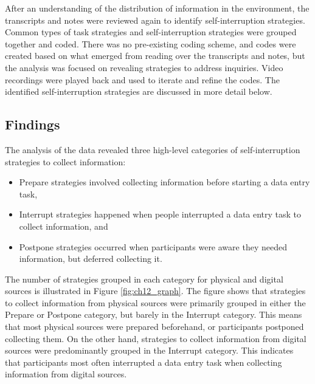 
After an understanding of the distribution of information in the environment, the transcripts and notes were reviewed again to identify self-interruption strategies. Common types of task strategies and self-interruption strategies were grouped together and coded. There was no pre-existing coding scheme, and codes were created based on what emerged from reading over the transcripts and notes, but the analysis was focused on revealing strategies to address inquiries. Video recordings were played back and used to iterate and refine the codes. The identified self-interruption strategies are discussed in more detail below. 

\subsection{Findings}
The analysis of the data revealed three high-level categories of self-interruption strategies to collect information: 

\begin{itemize}
\item
Prepare strategies involved collecting information before starting a data entry task, 
\item
Interrupt strategies happened when people interrupted a data entry task to collect information, and 
\item
Postpone strategies occurred when participants were aware they needed information, but deferred collecting it. 
\end{itemize}

The number of strategies grouped in each category for physical and digital sources is illustrated in Figure \ref{fig:ch12_graph}. The figure shows that strategies to collect information from physical sources were primarily grouped in either the Prepare or Postpone category, but barely in the Interrupt category. This means that most physical sources were prepared beforehand, or participants postponed collecting them. On the other hand, strategies to collect information from digital sources were predominantly grouped in the Interrupt category. This indicates that participants most often interrupted a data entry task when collecting information from digital sources. 

